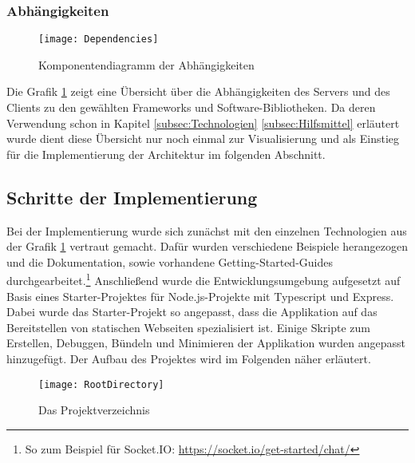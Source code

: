 \subsubsection{Abhängigkeiten}
\begin{figure}[htp]
	\centering
	\captionsetup{justification=centering}
	\texttt{[image: Dependencies]}
	\caption[Abhängigkeiten]{Komponentendiagramm der Abhängigkeiten}
	\label{fig:ComponentDependencies}
\end{figure}
\noindent Die Grafik \ref{fig:ComponentDependencies} zeigt eine Übersicht über die Abhängigkeiten des Servers und des Clients zu den gewählten Frameworks und Software-Bibliotheken. Da deren Verwendung schon in Kapitel \ref{subsec:Technologien} \bzw \ref{subsec:Hilfsmittel} erläutert wurde dient diese Übersicht nur noch einmal zur Visualisierung und als Einstieg für die Implementierung der Architektur im folgenden Abschnitt.
\subsection{Schritte der Implementierung}
\label{subsec:Implementierung}
Bei der Implementierung wurde sich zunächst mit den einzelnen Technologien aus der Grafik \ref{fig:ComponentDependencies} vertraut gemacht. Dafür wurden verschiedene Beispiele herangezogen und die Dokumentation, sowie \ggf vorhandene Getting-Started-Guides durchgearbeitet.\footnote{So zum Beispiel für Socket.IO: \url{https://socket.io/get-started/chat/}}
Anschließend wurde die Entwicklungsumgebung aufgesetzt auf Basis eines Starter-Projektes für Node.js-Projekte mit Typescript und Express.\cite{typescript_node_starter} Dabei wurde das Starter-Projekt so angepasst, dass die Applikation auf das Bereitstellen von statischen Webseiten spezialisiert ist. Einige Skripte zum Erstellen, Debuggen, Bündeln und Minimieren der Applikation wurden angepasst \bzw hinzugefügt. Der Aufbau des Projektes wird im Folgenden näher erläutert.

\begin{figure}[htp]
	\centering
	\captionsetup{justification=centering}
	\texttt{[image: RootDirectory]}
	\caption[Projektverzeichnis]{Das Projektverzeichnis}
	\label{fig:RootDirectory}
\end{figure}

